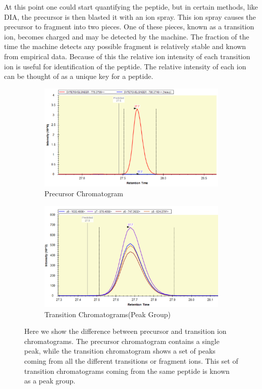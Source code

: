 \documentclass[12pt]{article}
\begin{document}
At this point one could start quantifying the peptide, but in certain methods, like DIA, the precursor is then blasted it with an ion spray. This ion spray causes the precursor to fragment into two pieces. One of these pieces, known as a transition ion, becomes charged and may be detected by the machine. The fraction of the time the machine detects any possible fragment is relatively stable and known from empirical data. Because of this the relative ion intensity of each transition ion is useful for identification of the peptide. The relative intensity of each ion can be thought of as a unique key for a peptide.

\begin{figure}
\centering
\begin{subfigure}{.5\textwidth}
  \centering
  \includegraphics[width=1\linewidth]{precursor}
  \caption{Precursor Chromatogram}
  \label{fig:sub1}
\end{subfigure}%
\begin{subfigure}{.5\textwidth}
  \centering
  \includegraphics[width=1\linewidth]{transitions}
  \caption{Transition Chromatograms(Peak Group)}
  \label{fig:sub2}
\end{subfigure}
\caption{Here we show the difference between precursor and transition ion chromatograms. The precursor chromatogram contains a single peak, while the transition chromatogram shows a set of peaks coming from all the different transitions or fragment ions. This set of transition chromatograms coming from the same peptide is known as a peak group.}
\label{fig:test}
\end{figure}
\end{document}
